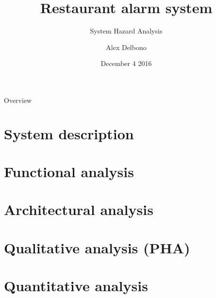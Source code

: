 \documentclass{beamer}
\title[Restaurant alarm system]{\textbf{Restaurant alarm system}}
\subtitle{System Hazard Analysis}
\author[Alex Delbono]{Alex Delbono \\ }
\institute[Politecnico di Milano]{\href{mailto:alex.delbono@mail.polimi.it}{alex.delbono@mail.polimi.it}  
		\newline 
		Politecnico di Milano}
\date{December 4 2016}
\begin{document}
\begin{frame}
  \titlepage
\end{frame}

\begin{frame}{Overview}
\tableofcontents
\end{frame}


\section{System description}
\label{sec:system_description}


\section{Functional analysis}
\label{sec:functional_analysis}


\section{Architectural analysis}
\label{sec:architectural_analysis}


\section{Qualitative analysis (PHA)}
\label{sec:qualitative_analysis}


\section{Quantitative analysis}
\label{sec:quantitative_analysis}





\end{document}

